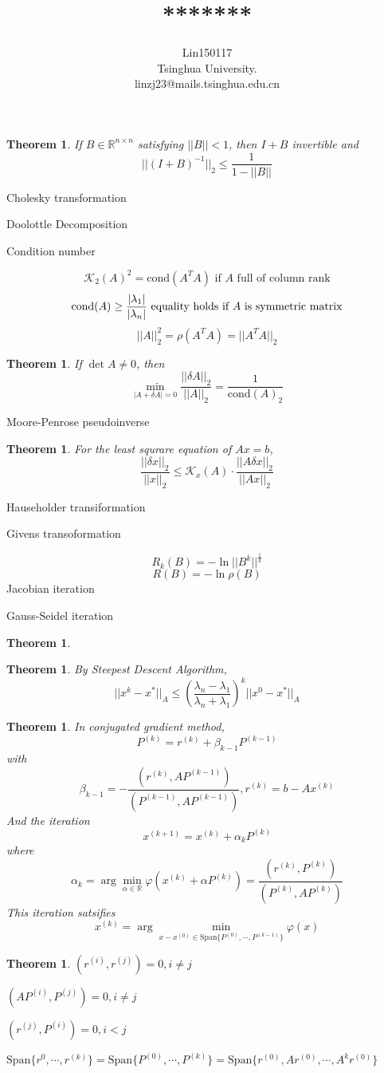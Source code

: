 \documentclass[12pt,b5paper,notitlepage]{article}
\title{*******}
\author{{\sc Lin150117}
	\\
	{\small \sc Tsinghua University.}\\
	{\small linzj23@mails.tsinghua.edu.cn}
}
\theoremstyle{definition}
\theoremstyle{remark}
\theoremstyle{plain}
\newtheorem{theorem}[definition]{Theorem}
\newcommand{\cond}{\mathrm{cond}}
\newcommand{\Span}{\mathrm{Span}}
\numberwithin{equation}{section}
\begin{document}
\sloppy
{}
\maketitle
\tableofcontents
\newpage

\begin{theorem}
    If  $ B\in\mathbb{R}^{n\times n} $ satisfying  $ ||B||<1 $, then  $ I+B  $ invertible and 
    \[||(I+B)^{-1}||_2 \leq \frac{1}{1-||B||}\]   
\end{theorem}
Cholesky transformation

Doolottle Decomposition

Condition number

\[\mathcal{K}_2(A)^2=\cond(A^TA)\text{ if }A\text{ full of column rank}\]
\[\cond(A) \geq \frac{|\lambda_1|}{|\lambda_n|}\text{ equality holds if  $ A $ is symmetric matrix}\]
\[||A||_2^2=\rho(A^TA)=||A^TA||_2\]
\begin{theorem}
    If  $ \det A\not=0 $, then 
    \[\min_{|A+\delta A|=0}\frac{||\delta A||_2}{||A||_2}=\frac{1}{\cond(A)_2}\] 
\end{theorem}
Moore-Penrose pseudoinverse

\begin{theorem}
    For the least squrare equation of  $ Ax=b $, 
    \[\frac{||\delta x||_2}{||x||_2} \leq \mathcal{K}_x(A)\cdot\frac{||A\delta x||_2}{||Ax||_2}\] 
\end{theorem}
Hauseholder transiformation

Givens transoformation

\[R_k(B)=-\ln ||B^k||^{\frac{1}{k}}\]
\[R(B)=-\ln \rho(B)\]
Jacobian iteration

Gauss-Seidel iteration

\begin{theorem}
    
\end{theorem}
\begin{theorem}
    By Steepest Descent Algorithm, 
    \[||x^k-x^*||_A \leq \left(\frac{\lambda_n-\lambda_1}{\lambda_n+\lambda_1}\right)^k||x^0-x^*||_A\]
\end{theorem}
\begin{theorem}
    In conjugated gradient method,
    \[P^{(k)}=r^{(k)}+\beta_{k-1}P^{(k-1)}\]
    with 
    \[\beta_{k-1}=-\frac{(r^{(k)},AP^{(k-1)})}{(P^{(k-1)},AP^{(k-1)})},r^{(k)}=b-Ax^{(k)}\]
    And the iteration
    \[x^{(k+1)}=x^{(k)}+\alpha_kP^{(k)}\]
    where 
    \[\alpha_k=\arg\min_{\alpha\in\mathbb R}\varphi(x^{(k)}+\alpha P^{(k)})=\frac{(r^{(k)},P^{(k)})}{(P^{(k)},AP^{(k)})}\]
    This iteration satsifies
    \[x^{(k)}=\arg\min_{x-x^{(0)}\in\Span\{P^{(0)},\cdots,P^{(k-1)}\}}\varphi(x)\]
\end{theorem}
\begin{theorem}
     $ (r^{(i)},r^{(j)})=0,i\not=j $
     
      $ (AP^{(i)},P^{(j)})=0 ,i\not=j$ 

       $ (r^{(j)},P^{(i)})=0,i<j $ 

        $ \Span\{r^{0},\cdots,r^{(k)}\}=\Span\{P^{(0)},\cdots,P^{(k)}\}=\Span\{r^{(0)},Ar^{(0)},\cdots,A^kr^{(0)}\} $ 
\end{theorem}
\printindex
\newpage
\listoftheorems[ignoreall, show={theorem,proposition}]
\end{document}
